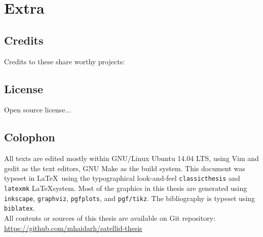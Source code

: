\chapter*{Extra}
\label{chap:extra}

\section*{Credits}
\label{sec:credits}

Credits to these share worthy projects:

\section*{License}
\label{sec:license}

Open source license...

\section*{Colophon}
\label{sec:colophon}

All texts are edited mostly within GNU/Linux Ubuntu 14.04 LTS, using Vim and gedit as the text editors, GNU Make as the build system.
This document was typeset in \LaTeX~using the typographical look-and-feel \texttt{classicthesis} and \verb|latexmk| \LaTeX system.
Most of the graphics in this thesis are generated using \texttt{inkscape}, \texttt{graphviz}, \texttt{pgfplots}, and \texttt{pgf/tikz}.
The bibliography is typeset using \texttt{biblatex}.
\\
All contents or sources of this thesis are available on Git repository:\\
\url{https://github.com/mhaidarh/satellid-thesis}
